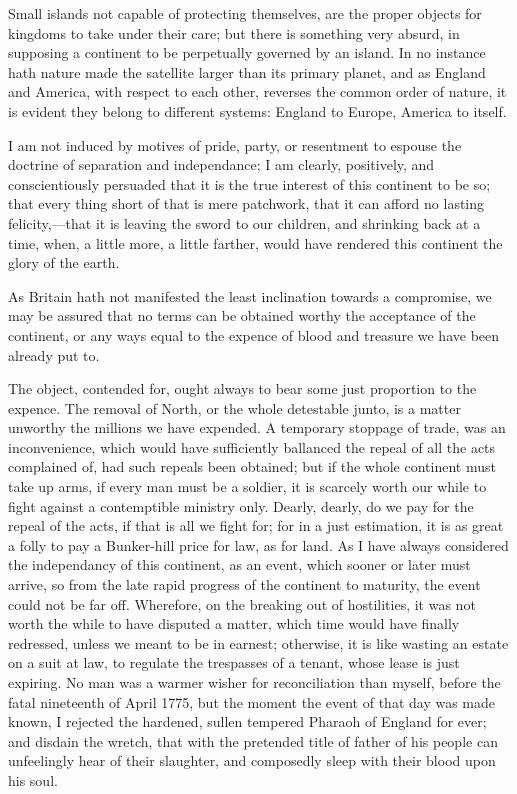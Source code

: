 \documentclass[12pt,oneside]{memoir}
\begin{document}
Small islands not capable of protecting themselves, are the proper objects for kingdoms to take under their care; but there is something very absurd, in supposing a continent to be perpetually governed by an island. In no instance hath nature made the satellite larger than its primary planet, and as England and America, with respect to each other, reverses the common order of nature, it is evident they belong to different systems: England to Europe, America to itself.

I am not induced by motives of pride, party, or resentment to espouse the doctrine of separation and independance; I am clearly, positively, and conscientiously persuaded that it is the true interest of this continent to be so; that every thing short of that is mere patchwork, that it can afford no lasting felicity,---that it is leaving the sword to our children, and shrinking back at a time, when, a little more, a little farther, would have rendered this continent the glory of the earth.

As Britain hath not manifested the least inclination towards a compromise, we may be assured that no terms can be obtained worthy the acceptance of the continent, or any ways equal to the expence of blood and treasure we have been already put to.

The object, contended for, ought always to bear some just proportion to the expence. The removal of North, or the whole detestable junto, is a matter unworthy the millions we have expended. A temporary stoppage of trade, was an inconvenience, which would have sufficiently ballanced the repeal of all the acts complained of, had such repeals been obtained; but if the whole continent must take up arms, if every man must be a soldier, it is scarcely worth our while to fight against a contemptible ministry only. Dearly, dearly, do we pay for the repeal of the acts, if that is all we fight for; for in a just estimation, it is as great a folly to pay a Bunker-hill price for law, as for land. As I have always considered the independancy of this continent, as an event, which sooner or later must arrive, so from the late rapid progress of the continent to maturity, the event could not be far off. Wherefore, on the breaking out of hostilities, it was not worth the while to have disputed a matter, which time would have finally redressed, unless we meant to be in earnest; otherwise, it is like wasting an estate on a suit at law, to regulate the trespasses of a tenant, whose lease is just expiring. No man was a warmer wisher for reconciliation than myself, before the fatal nineteenth of April 1775, but the moment the event of that day was made known, I rejected the hardened, sullen tempered Pharaoh of England for ever; and disdain the wretch, that with the pretended title of father of his people can unfeelingly hear of their slaughter, and composedly sleep with their blood upon his soul.
\end{document}
